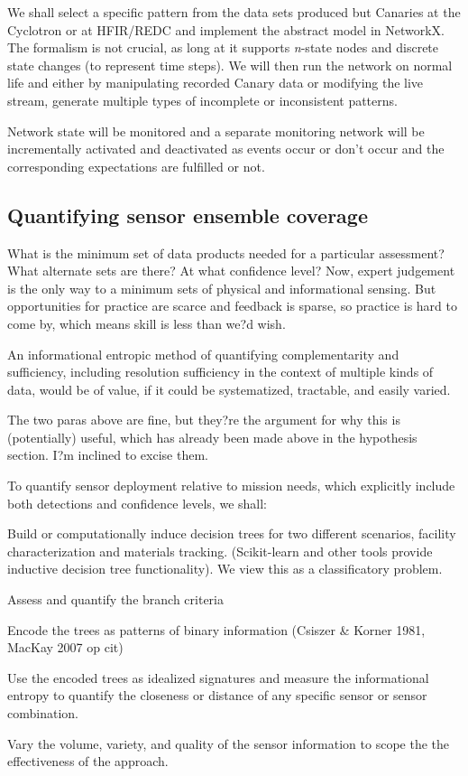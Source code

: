\documentclass{article} %
\begin{document}
We shall select a specific pattern from the data sets produced but Canaries at the Cyclotron or at HFIR/REDC and implement the abstract model in NetworkX. The formalism is not crucial, as long at it supports \textit{n}-state nodes and discrete state changes (to represent time steps). We will then run the network on normal life and either by manipulating recorded Canary data or modifying the live stream, generate multiple types of incomplete or inconsistent patterns.

Network state will be monitored and a separate monitoring network will be incrementally activated and deactivated as events occur or don't occur and the corresponding expectations are fulfilled or not.

\subsection{Quantifying sensor ensemble coverage}
What is the minimum set of data products needed for a particular assessment? What alternate sets are there? At what confidence level? Now, expert judgement is the only way to a minimum sets of physical and informational sensing. But opportunities for practice are scarce and feedback is sparse, so practice is hard to come by, which means skill is less than we?d wish.

An informational entropic method of quantifying complementarity and sufficiency, including resolution sufficiency in the context of multiple kinds of data, would be of value, if it could be systematized, tractable, and easily varied.

{\color {red} The two paras above are fine, but they?re the argument for why this is (potentially) useful, which has already been made above in the hypothesis section. I?m inclined to excise them.}
 
To quantify sensor deployment relative to mission needs, which explicitly include both detections and confidence levels, we shall:

\begin{enumerate*}
\item Build or computationally induce decision trees for two different scenarios, facility characterization and materials tracking. (Scikit-learn and other tools provide inductive decision tree functionality). We view this as a classificatory problem.
\item Assess and quantify the branch criteria
\item Encode the trees as patterns of binary information (Csiszer \& Korner 1981, MacKay 2007 op cit)
\item Use the encoded trees as idealized signatures and measure the informational entropy to quantify the closeness or distance of any specific sensor or sensor combination.
\item Vary the volume, variety, and quality of the sensor information to scope the the effectiveness of the approach.
\end{enumerate*}
\end{document}
